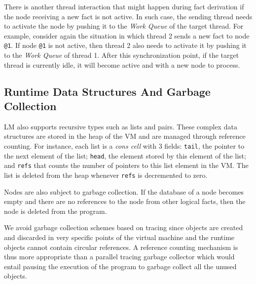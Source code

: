 There is another thread interaction that might happen during fact derivation if
the node receiving a new fact is not active. In such case, the sending thread
needs to activate the node by pushing it to the \emph{Work Queue} of the target
thread. For example, consider again the situation in which thread 2 sends a new
fact to node \texttt{@1}. If node \texttt{@1} is not active, then thread 2 also
needs to activate it by pushing it to the \emph{Work Queue} of thread 1. After
this synchronization point, if the target thread is currently idle, it will
become active and with a new node to process.

\subsection{Runtime Data Structures And Garbage Collection}

LM also supports recursive types such as lists and pairs. These complex data
structures are stored in the heap of the VM and are managed through reference
counting. For instance, each list is a \emph{cons cell} with 3 fields:
\texttt{tail}, the pointer to the next element of the list; \texttt{head}, the
element stored by this element of the list; and \texttt{refs} that counts the
number of pointers to this list element in the VM. The list is deleted from the
heap whenever \texttt{refs} is decremented to zero.

Nodes are also subject to garbage collection. If the database of a node becomes
empty and there are no references to the node from other logical facts, then
the node is deleted from the program.

We avoid garbage collection schemes based on tracing since objects are created
and discarded in very specific points of the virtual machine and the runtime
objects cannot contain circular references. A reference counting mechanism is
thus more appropriate than a parallel tracing garbage collector which would
entail pausing the execution of the program to garbage collect all the unused
objects.
